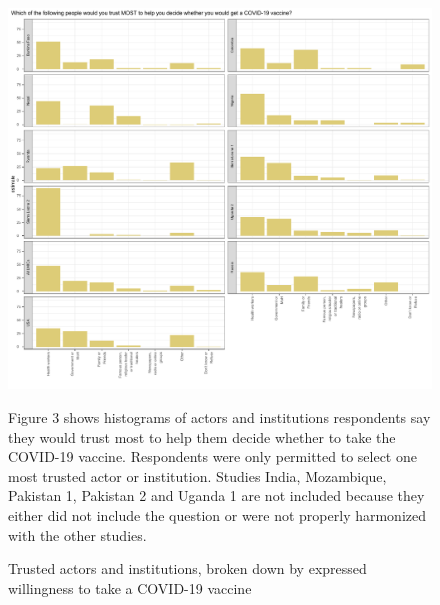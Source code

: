 \documentclass[
  12pt,
]{article}
\begin{document}
\begin{figure}[!ht]
\caption{Trusted actors and institutions, broken down by expressed willingness to take a COVID-19 vaccine \label{fig:fig3paper}}

\newpage

\includegraphics{paper_files/figure-latex/fig3paper-1.pdf}
\newpage

\scriptsize{Figure 3 shows histograms of actors and institutions respondents say they would trust most to help them decide whether to take the COVID-19 vaccine. Respondents were only permitted to select one most trusted actor or institution. Studies India, Mozambique, Pakistan 1, Pakistan 2 and Uganda 1 are not included because they either did not include the question or were not properly harmonized with the other studies.}
\end{figure}

\newpage
\end{document}
